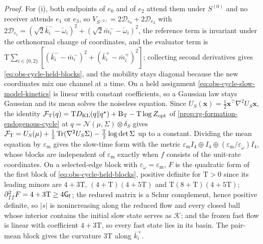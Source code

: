 \noindent\emph{Proof.}
For (i), both endpoints of $e_0$ and of $e_2$ attend them under $S^{(0)}$ and no
receiver attends $e_1$ or $e_3$, so $V_{S^{(0)}}=2\mathcal D_{e_0}+2\mathcal D_{e_2}$
with $2\mathcal D_{e_i}=(\sqrt2\bar k^-_i-\check\omega_i)^2+(\sqrt2\bar m^-_i-\check\omega_i)^2$,
the reference term is invariant under the orthonormal change of coordinates, and
the evaluator term is
$\mathrm T\sum_{i\in\{0,2\}}[(\bar k^-_i-\bar m^-_i)^2+(\bar k^+_i-\bar m^+_i)^2]$;
collecting second derivatives gives \eqref{eq:obs-cycle-held-blocks}, and the
mobility stays diagonal because the new coordinates mix one channel at a time. On a
held assignment \eqref{eq:obs-cycle-slow-model-kinetics} is linear with constant
coefficients, so a Gaussian law stays Gaussian and its mean solves the noiseless
equation. Since $U_S(\mathbf x)=\frac12\mathbf x^\top\nabla^2U_S\mathbf x$, the
identity
$\mathcal F_{\mathrm T}(q)=\mathrm TD_{\mathrm{KL}}(q\Vert q^\star)+\mathrm B_{\mathrm T}-\mathrm T\log Z_{\mathrm{opt}}$
of \cref{prop:rg-formation-endogenous-cycle} at $q=\mathcal N(\mu,\Sigma)\otimes\delta_S$
gives $\mathcal F_{\mathrm T}=U_S(\mu)+\frac12\operatorname{Tr}(\nabla^2U_S\Sigma)-\frac{\mathrm T}2\log\det\Sigma$
up to a constant. Dividing the mean equation by $\varepsilon_{\mathrm m}$ gives the
slow-time form with the metric
$\varepsilon_{\mathrm m}I_4\oplus I_4\oplus(\varepsilon_{\mathrm m}/\varepsilon_{\check\omega})I_4$,
whose blocks are independent of $\varepsilon_{\mathrm m}$ exactly when $f$ consists
of the unit-rate coordinates. On a selected-edge block with
$\varepsilon_{\check\omega}=\varepsilon_{\mathrm m}$, $F$ is the quadratic form of the first
block of \eqref{eq:obs-cycle-held-blocks}, positive definite for $\mathrm T>0$ since
its leading minors are $4+3\mathrm T$, $(4+\mathrm T)(4+5\mathrm T)$ and
$\mathrm T(8+\mathrm T)(4+5\mathrm T)$; $\partial^2_{ff}F=4+3\mathrm T\ge4\mathsf G_{\rm f}$;
the reduced matrix is a Schur complement, hence positive definite, so $|s|$ is
nonincreasing along the reduced flow and every closed ball whose interior contains
the initial slow state serves as $\mathcal K$; and the frozen fast flow is linear
with coefficient $4+3\mathrm T$, so every fast state lies in its basin. The
pair-mean block gives the curvature $3\mathrm T$ along $\bar k^+_i$.

